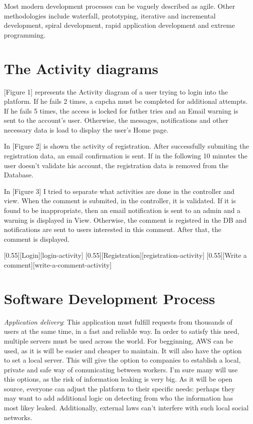 \documentclass{article}
\begin{document}
			Most modern development processes can be vaguely described as agile. Other methodologies include waterfall, prototyping, iterative and incremental development, spiral development, rapid application development and extreme programming.

	\section{The Activity diagrams}
		[Figure 1] represents the Activity diagram of a user trying to login into the platform. If he fails 2 times, a capcha must be completed for additional attempts. If he fails 5 times, the access is locked for futher tries and an Email warning is sent to the account's user. Otherwise, the messages, notifications and other necessary data is load to display the user's Home page.

		\bigskip
		In [Figure 2] is shown the activity of registration. After successfully submiting the registration data, an email confirmation is sent. If in the following 10 minutes the user doesn't validate his account, the registration data is removed from the Database.

		\bigskip
		In [Figure 3] I tried to separate what activities are done in the controller and view. When the comment is submited, in the controller, it is validated. If it is found to be inappropriate, then an email notification is sent to an admin and a warning is displayed in View. Otherwise, the comment is registred in the DB and notifications are sent to users interested in this comment. After that, the comment is displayed.

		[Login][login-activity]
		[Registration][registration-activity]
		[Write a comment][write-a-comment-activity]


	\section{Software Development Process}
		\textit{Application delivery}: This application must fulfill requests from thousands of users at the same time, in a fast and reliable way. In order to satisfy this need, multiple servers must be used across the world. For begginning, AWS can be used, as it is will be easier and cheaper to maintain. It will also have the option to set a local server. This will give the option to companies to establish a local, private and safe way of comunicating between workers. I'm sure many will use this options, as the risk of information leaking is very big. As it will be open source, everyone can adjust the platform to their specific needs: perhaps they may want to add additional logic on detecting from who the information has most likey leaked. Additionally, external laws can't interfere with such local social networks.
\end{document}
